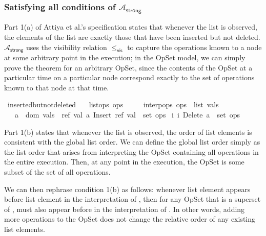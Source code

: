 \subsubsection{Satisfying all conditions of $\mathcal{A}_\textsf{strong}$}

Part 1(a) of Attiya et al.'s specification states that whenever the list is observed, the elements of the list are exactly those that have been inserted but not deleted.
$\mathcal{A}_\textsf{strong}$ uses the visibility relation $\le_\textsf{vis}$ to capture the operations known to a node at some arbitrary point in the execution; in the OpSet model, we can simply prove the theorem for an arbitrary OpSet, since the contents of the OpSet at a particular time on a particular node correspond exactly to the set of operations known to that node at that time.

\begin{isabelle}
\isamarkupfalse%
\ inserted{\isacharunderscore}but{\isacharunderscore}not{\isacharunderscore}deleted{\isacharcolon}\isanewline
\ \ \ {\isachardoublequoteopen}list{\isacharunderscore}ops\ ops{\isachardoublequoteclose}\isanewline
\ \ \ \ \ {\isachardoublequoteopen}interp{\isacharunderscore}ops\ ops\ {\isacharequal}\ {\isacharparenleft}list{\isacharcomma}\ vals{\isacharparenright}{\isachardoublequoteclose}\isanewline
\ \ \ {\isachardoublequoteopen}a\ {\isasymin}\ dom\ {\isacharparenleft}vals{\isacharparenright}\ {\isasymlongleftrightarrow}\ {\isacharparenleft}{\isasymexists}ref\ val{\isachardot}\ {\isacharparenleft}a{\isacharcomma}\ Insert\ ref\ val{\isacharparenright}\ {\isasymin}\ set\ ops{\isacharparenright}\ {\isasymand}\isanewline
\hspace{47mm}{\isacharparenleft}{\isasymnexists}i{\isachardot}\ {\isacharparenleft}i{\isacharcomma}\ Delete\ a{\isacharparenright}\ {\isasymin}\ set\ ops{\isacharparenright}{\isachardoublequoteclose}
\end{isabelle}

Part 1(b) states that whenever the list is observed, the order of list elements is consistent with the global list order.
We can define the global list order simply as the list order that arises from interpreting the OpSet containing all operations in the entire execution.
Then, at any point in the execution, the OpSet is some subset of the set of all operations.

We can then rephrase condition 1(b) as follows: whenever list element  appears before list element  in the interpretation of , then for any OpSet  that is a superset of ,  must also appear before  in the interpretation of .
In other words, adding more operations to the OpSet does not change the relative order of any existing list elements.

